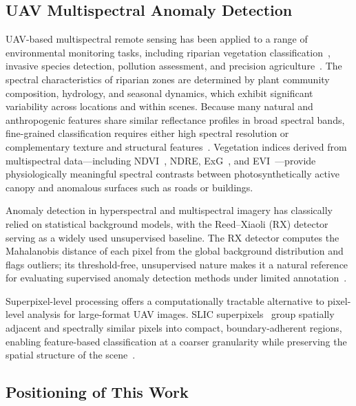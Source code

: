 \documentclass[lettersize,journal]{IEEEtran}
\begin{document}
\subsection{UAV Multispectral Anomaly Detection}

UAV-based multispectral remote sensing has been applied to a range of
environmental monitoring tasks, including riparian vegetation
classification~\cite{arguello2021watershed,lopezfandino2022deep},
invasive species detection, pollution assessment, and precision
agriculture~\cite{colomina2014uav,yuan2021review,zhang2019precision}.
The spectral characteristics of riparian zones are determined by plant
community composition, hydrology, and seasonal dynamics, which exhibit
significant variability across locations and within scenes. Because many
natural and anthropogenic features share similar reflectance profiles in
broad spectral bands, fine-grained classification requires either high
spectral resolution or complementary texture and structural
features~\cite{arguello2021watershed,kampffmeyer2016semantic}.
Vegetation indices derived from multispectral data---including
NDVI~\cite{rouse1974monitoring}, NDRE, ExG~\cite{woebbecke1995color},
and EVI~\cite{huete2002overview}---provide physiologically meaningful
spectral contrasts between photosynthetically active canopy and
anomalous surfaces such as roads or buildings.

Anomaly detection in hyperspectral and multispectral imagery has
classically relied on statistical background models, with the
Reed--Xiaoli (RX) detector~\cite{reed1990adaptive} serving as a widely
used unsupervised baseline. The RX detector computes the Mahalanobis
distance of each pixel from the global background distribution and
flags outliers; its threshold-free, unsupervised nature makes it a
natural reference for evaluating supervised anomaly detection methods
under limited annotation~\cite{chanussot2009hyperspectral}.

Superpixel-level processing offers a computationally tractable
alternative to pixel-level analysis for large-format UAV images. SLIC
superpixels~\cite{achanta2012slic} group spatially adjacent and
spectrally similar pixels into compact, boundary-adherent regions,
enabling feature-based classification at a coarser granularity while
preserving the spatial structure of the scene~\cite{li2019domain}.

\subsection{Positioning of This Work}
\end{document}
